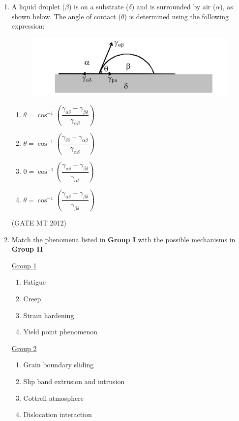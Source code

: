 \documentclass[journal, 11pt, onecolumn]{IEEEtran}
\theoremstyle{remark}
\begin{document}
\begin{enumerate}
\begin{enumerate}
\item A liquid droplet ($\beta$) is on a substrate ($\delta$) and is surrounded by air ($\alpha$), as shown below. The angle of contact ($\theta$) is determined using the following expression:

\begin{figure}
    \centering
    \includegraphics[width=0.5\linewidth]{figs/image2.png}
    \caption{}
    \label{fig:placeholder}
\end{figure}

\begin{multicols}{2}
\begin{enumerate}  
\item $\theta = \cos^{-1} \left( \dfrac{\gamma_{\alpha \delta} - \gamma_{\beta \delta}}{\gamma_{\alpha \beta}} \right)$
\item $\theta = \cos^{-1} \left( \dfrac{\gamma_{\delta \delta} - \gamma_{\alpha \beta}}{\gamma_{\alpha \beta}} \right)$
\item $0 = \cos^{-1} \left( \dfrac{\gamma_{\alpha \delta} - \gamma_{\beta \delta}}{\gamma_{\alpha \delta}} \right)$
\item $\theta = \cos^{-1} \left( \dfrac{\gamma_{\alpha \delta} - \gamma_{\beta \delta}}{\gamma_{\beta \delta}} \right)$
\end{enumerate}
\end{multicols}
\hfill(GATE MT 2012)

\item Match the phenomena listed in \textbf{Group I} with the possible mechanisms in \textbf{Group II}
\begin{multicols}{2}
\underline{Group 1}
\begin{enumerate}[label=(\Alph*), start=16]
\item Fatigue   
\item Creep
\item Strain hardening  
\item Yield point phenomenon
\end{enumerate}

\underline{Group 2}
\begin{enumerate}[label=(\arabic*), start=1]
\item Grain boundary sliding 
\item Slip band extrusion and intrusion
\item Cottrell atmosphere
\item Dislocation interaction
\end{enumerate}
\end{multicols}


\end{enumerate}
\end{enumerate}
\end{document}
